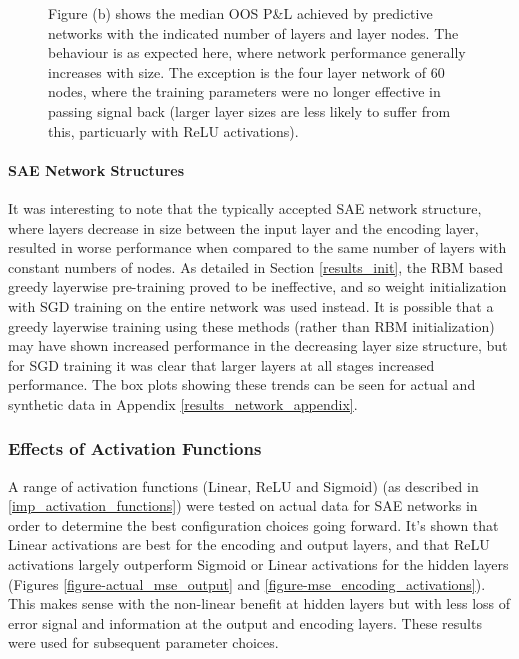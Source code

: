 \documentclass[a4paper,11pt,oneside]{article}
\theoremstyle{plain}
\theoremstyle{definition}
\begin{document}
\begin{figure}[H]
{			\newline Figure (b) shows the median OOS P\&L achieved by predictive networks with the indicated number of layers and layer nodes. The behaviour is as expected here, where network performance generally increases with size. The exception is the four layer network of 60 nodes, where the training parameters were no longer effective in passing signal back (larger layer sizes are less likely to suffer from this, particuarly with ReLU activations).
		}
		\label{figure-network_size}
	\end{figure}
	
	\paragraph{SAE Network Structures}
	
	It was interesting to note that the typically accepted SAE network structure, where layers decrease in size between the input layer and the encoding layer, resulted in worse performance when compared to the same number of layers with constant numbers of nodes. As detailed in Section \ref{results_init}, the RBM based greedy layerwise pre-training proved to be ineffective, and so weight initialization with SGD training on the entire network was used instead. It is possible that a greedy layerwise training using these methods (rather than RBM initialization) may have shown increased performance in the decreasing layer size structure, but for SGD training it was clear that larger layers at all stages increased performance. The box plots showing these trends can be seen for actual and synthetic data in Appendix \ref{results_network_appendix}.

	
	
	\subsubsection{Effects of Activation Functions}\label{results_activations_scaling}
	
	A range of activation functions (Linear, ReLU and Sigmoid) (as described in \ref{imp_activation_functions}) were tested on actual data for SAE networks in order to determine the best configuration choices going forward. It's shown that Linear activations are best for the encoding and output layers, and that ReLU activations largely outperform Sigmoid or Linear activations for the hidden layers (Figures \ref{figure-actual_mse_output} and \ref{figure-mse_encoding_activations}). This makes sense with the non-linear benefit at hidden layers but with less loss of error signal and information at the output and encoding layers. These results were used for subsequent parameter choices.
	
\end{document}

